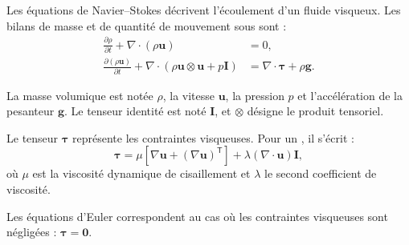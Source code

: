Les équations de Navier--Stokes décrivent l'écoulement d'un fluide visqueux.
Les bilans de masse et de quantité de mouvement sous
 sont :
\begin{equation}
    \label{eq:navier_stokes}
    \boxed{
        \begin{aligned}
            \frac{\partial \rho}{\partial t}
            + \nabla \cdot (\rho \mathbf{u})
            &= 0, \\
            \frac{\partial (\rho \mathbf{u})}{\partial t}
            + \nabla \cdot \left(
                \rho \mathbf{u} \otimes \mathbf{u} + p \mathbf{I}
            \right)
            &= \nabla \cdot \boldsymbol{\tau} + \rho \mathbf{g}.
        \end{aligned}}
\end{equation}

La masse volumique est notée $\rho$, la vitesse $\mathbf{u}$,
la pression $p$ et l'accélération de la pesanteur $\mathbf{g}$.
Le tenseur identité est noté $\mathbf{I}$, et $\otimes$ désigne
le produit tensoriel.

Le tenseur $\boldsymbol{\tau}$ représente les contraintes visqueuses.
Pour un , il s'écrit :
\begin{equation}
    \label{eq:viscous_stress}
    \boldsymbol{\tau}
    = \mu \left[\nabla \mathbf{u}
        + (\nabla \mathbf{u})^{\mathsf{T}}\right]
    + \lambda (\nabla \cdot \mathbf{u})\mathbf{I},
\end{equation}
où $\mu$ est la viscosité dynamique de cisaillement et $\lambda$
le second coefficient de viscosité.

Les équations d'Euler correspondent au cas où les contraintes visqueuses
sont négligées : $\boldsymbol{\tau} = \mathbf{0}$.


